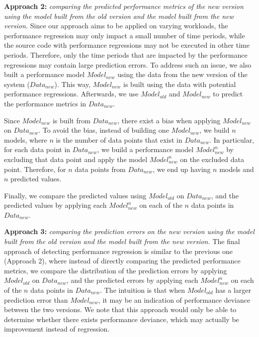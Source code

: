 \noindent\textbf{Approach 2: }\emph{comparing the predicted performance metrics of the new version using the model built from the old version and the model built from the new version.} %
Since our approach aims to be applied on varying workloads, the performance regression may only impact a small number of time periods, while the source code with performance regressions may not be executed in other time periods. Therefore, only the time periods that are impacted by the performance regressions may contain large prediction errors. To address such an issue, we also built a performance model $Model_{new}$ using the data from the new version of the system ($Data_{new}$). 
This way, $Model_{new}$ is built using the data with potential performance regressions. 
Afterwards, we use $Model_{old}$ and $Model_{new}$ to predict the performance metrics in $Data_{new}$. 

Since $Model_{new}$ is built from $Data_{new}$, there exist a bias when applying $Model_{new}$ on $Data_{new}$. To avoid the bias, instead of building one $Model_{new}$, we build $n$ models, where $n$ is the number of data points that exist in $Data_{new}$. In particular, for each data point in $Data_{new}$, we build a performance model $Model_{new}^n$ by excluding that data point and apply the model $Model_{new}^n$ on the excluded data point. Therefore, for $n$ data points from $Data_{new}$, we end up having $n$ models and $n$ predicted values. 

Finally, we compare the predicted values using $Model_{old}$ on $Data_{new}$, and the predicted values by applying each $Model_{new}^n$ on each of the $n$ data points in $Data_{new}$.


\noindent\textbf{Approach 3: }\emph{comparing the prediction errors on the new version using the model built from the old version and the model built from the new version.} %
The final approach of detecting performance regression is similar to the previous one (Approach 2), where instead of directly comparing the predicted performance metrics, we compare the distribution of the prediction errors by applying $Model_{old}$ on $Data_{new}$, and the predicted errors by applying each $Model_{new}^n$ on each of the $n$ data points in $Data_{new}$. The intuition is that when $Model_{old}$ has a larger prediction error than $Model_{new}$, it may be an indication of performance deviance between the two versions. We note that this approach would only be able to determine whether there exists performance deviance, which may actually be improvement instead of regression. 

